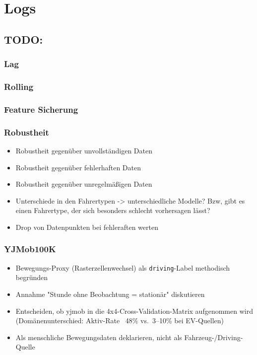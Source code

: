 \color{red}
\chapter*{Logs}
\section{\textbf{TODO:}}
\subsection{Lag}



\subsection{Rolling}


\subsection{Feature Sicherung}


\subsection{Robustheit}
\begin{itemize}
    \item Robustheit gegenüber unvollständigen Daten
    \item Robustheit gegenüber fehlerhaften Daten
    \item Robustheit gegenüber unregelmäßigen Daten
    \item Unterschiede in den Fahrertypen -> unterschiedliche Modelle? Bzw, gibt es einen Fahrertype, der sich besonders schlecht vorhersagen lässt?
\end{itemize}

\begin{itemize}
    \item Drop von Datenpunkten bei fehleraften werten
\end{itemize}

\subsection{YJMob100K}
\begin{itemize}
    \item Bewegungs-Proxy (Rasterzellenwechsel) als \texttt{driving}-Label methodisch begründen
    \item Annahme "Stunde ohne Beobachtung = stationär" diskutieren
    \item Entscheiden, ob yjmob in die 4x4-Cross-Validation-Matrix aufgenommen wird (Domänenunterschied: Aktiv-Rate ~48\% vs.\ 3--10\% bei EV-Quellen)
    \item Als menschliche Bewegungsdaten deklarieren, nicht als Fahrzeug-/Driving-Quelle
\end{itemize}

